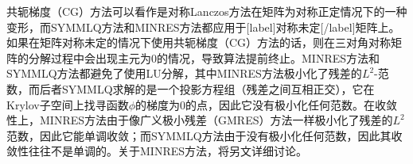 \documentclass[UTF8,nofonts]{ctexart}
\begin{document}
共轭梯度（CG）方法可以看作是对称Lanczos方法在矩阵为对称正定情况下的一种变形，而SYMMLQ方法和MINRES方法都应用于[label]对称未定[/label]矩阵上。如果在矩阵对称未定的情况下使用共轭梯度（CG）方法的话，则在三对角对称矩阵的分解过程中会出现主元为$0$的情况，导致算法提前终止。MINRES方法和SYMMLQ方法都避免了使用LU分解，其中MINRES方法极小化了残差的$L^2$-范数，而后者SYMMLQ求解的是一个投影方程组（残差之间互相正交），它在Krylov子空间上找寻函数$\phi$的梯度为$0$的点，因此它没有极小化任何范数。在收敛性上，MINRES方法由于像广义极小残差（GMRES）方法一样极小化了残差的$L^2$范数，因此它能单调收敛；而SYMMLQ方法由于没有极小化任何范数，因此其收敛性往往不是单调的。关于MINRES方法，将另文详细讨论。



\begin{algorithm}[H]
\end{algorithm}

\end{document}
